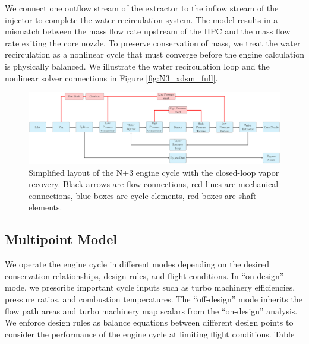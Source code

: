 \documentclass[conf]{new-aiaa}
\begin{document}
We connect one outflow stream of the extractor to the inflow stream of the injector to complete the water recirculation system.
The model results in a mismatch between the mass flow rate upstream of the HPC and the mass flow rate exiting the core nozzle.
To preserve conservation of mass, we treat the water recirculation as a nonlinear cycle that must converge before the engine calculation is physically balanced.
We illustrate the water recirculation loop and the nonlinear solver connections in Figure \ref{fig:N3_xdsm_full}.

\begin{figure}[hbt!]
    \centering
    \includegraphics[width=1.0\textwidth]{N3_CLVR_cycle.pdf}
    \caption{
        Simplified layout of the N+3 engine cycle with the closed-loop vapor recovery.
        Black arrows are flow connections, red lines are mechanical connections, blue boxes are cycle elements, red boxes are shaft elements.
    }
    \label{fig:n3_clvr}
\end{figure}

\subsection{Multipoint Model}
We operate the engine cycle in different modes depending on the desired conservation relationships, design rules, and flight conditions.
In ``on-design'' mode, we prescribe important cycle inputs such as turbo machinery efficiencies, pressure ratios, and combustion temperatures.
The ``off-design'' mode inherits the flow path areas and turbo machinery map scalars from the ``on-design'' analysis.
We enforce design rules as balance equations between different design points to consider the performance of the engine cycle at limiting flight conditions.
Table
\end{document}
